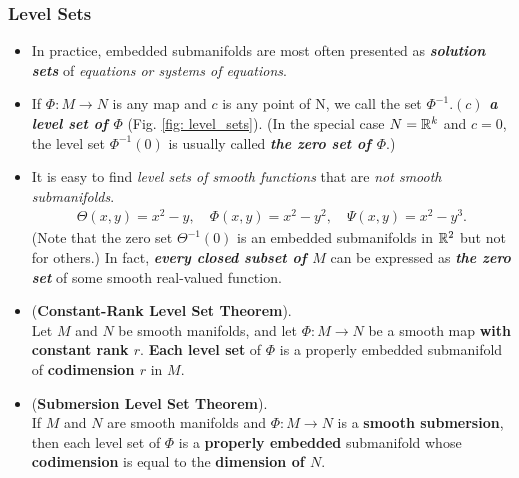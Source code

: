 \documentclass[11pt]{article}
\begin{document}
\subsubsection{Level Sets}
\begin{itemize}
\item \begin{remark}
In practice, embedded submanifolds are most often presented as \emph{\textbf{solution sets}} of \emph{equations or systems of equations}.
\end{remark}


\item \begin{definition}
If $\Phi: M \rightarrow N$ is any map and $c$ is any point of N, we call the set \emph{\textbf{$\Phi^{-1}.(c)$ a level set of $\Phi$}} (Fig. \ref{fig: level_sets}). (In the special case $N = {\mathbb R}^k$ and $c = 0$, the level set $\Phi^{-1}(0)$ is usually called \emph{\textbf{the zero set of $\Phi$}}.)
\end{definition}

\item \begin{remark}
It is easy to find \emph{level sets of smooth functions} that are \emph{not smooth submanifolds}. 
\begin{align*}
\Theta(x,y)  = x^2 - y, \quad \Phi(x,y) = x^2 - y^2, \quad  \Psi(x, y) = x^2 -y^3.
\end{align*} (Note that the zero set $\Theta^{-1}(0)$ is an embedded submanifolds in ${\mathbb R}^{2}$ but not for others.) In fact, \emph{\textbf{every closed subset of $M$}} can be expressed as \emph{\textbf{the zero set}} of some smooth real-valued function.
\end{remark}

\item \begin{theorem} (\textbf{Constant-Rank Level Set Theorem}). \citep{lee2003introduction} \\
Let $M$ and $N$ be smooth manifolds, and let $\Phi: M \rightarrow N$ be a smooth map \textbf{with constant rank $r$}. \textbf{Each level set} of $\Phi$ is a properly embedded submanifold of \textbf{codimension $r$} in $M$.
\end{theorem}

\item \begin{corollary} (\textbf{Submersion Level Set Theorem}). \citep{lee2003introduction} \\
 If $M$ and $N$ are smooth manifolds and $\Phi: M \rightarrow N$ is a \textbf{smooth submersion}, then each level set of $\Phi$ is a \textbf{properly embedded} submanifold whose \textbf{codimension} is equal to the \textbf{dimension of $N$}.
\end{corollary}


\end{itemize}
\end{document}
